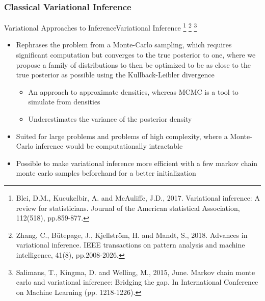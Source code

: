 \documentclass[AERbeamer%
              ,optEnglish%
              ,optBiber%
              ,optBibstyleAlphabetic%
              ,optBeamerClassicFormat%
              ]{AERlatex}%
\begin{document}
\subsubsection*{Classical Variational Inference}
\begin{frame}[c]{Variational Approaches to Inference}{Variational Inference \footnote{Blei, D.M., Kucukelbir, A. and McAuliffe, J.D., 2017. Variational inference: A
                                                                                      review for statisticians. Journal of the American statistical Association, 112(518),
                                                                                      pp.859-877.}
                                                                            \footnote{Zhang, C., Bütepage, J., Kjellström, H. and Mandt, S., 2018. Advances in variational inference.
                                                                                      IEEE transactions on pattern analysis and machine intelligence, 41(8), pp.2008-2026.}
                                                                            \footnote{Salimans, T., Kingma, D. and Welling, M., 2015, June. Markov chain monte carlo and variational
                                                                                      inference: Bridging the gap. In International Conference on Machine Learning (pp. 1218-1226).}}
    \centering
    \begin{itemize}
        \item Rephrases the problem from a Monte-Carlo sampling, which requires significant computation but converges to the true posterior to one,
              where we propose a family of distributions to then be optimized to be as close to the true posterior as possible using the Kullback-Leibler
              divergence
        \begin{itemize}
            \item An approach to approximate densities, whereas MCMC is a tool to simulate from densities
            \item Underestimates the variance of the posterior density
        \end{itemize}
        \item Suited for large problems and problems of high complexity, where a Monte-Carlo inference would be computationally intractable
        \item Possible to make variational inference more efficient with a few markov chain monte carlo samples beforehand for a better initialization
    \end{itemize}
\end{frame}
\end{document}
